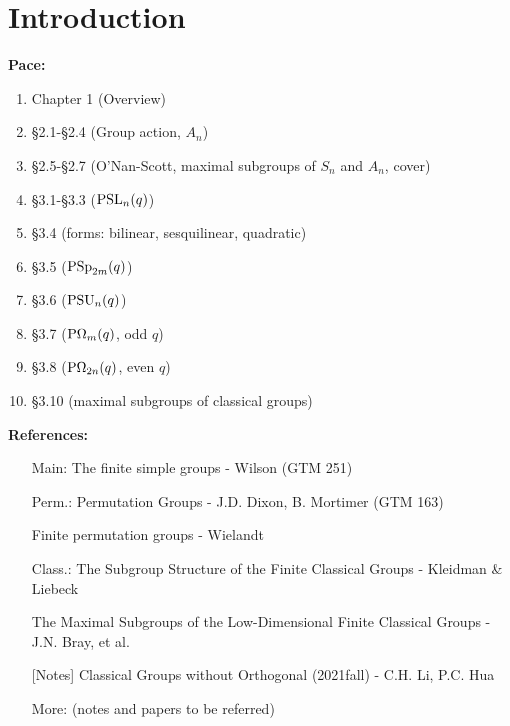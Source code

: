 \documentclass[a4paper,11pt]{article}
\begin{document}
\else %
\fi

\section{Introduction}
\textbf{Pace: }
\begin{enumerate}
	\item Chapter 1 (Overview)
	\item \S 2.1-\S 2.4 (Group action, $A_n$)
	\item \S 2.5-\S 2.7 (O'Nan-Scott, maximal subgroups of $S_n$ and $A_n$, cover)
	\item \S 3.1-\S 3.3 ($\mathrm{PSL}_n(q)$)
	\item \S 3.4 (forms: bilinear, sesquilinear, quadratic)
	\item \S 3.5 ($\mathrm{PSp}_{2m}(q)$)
	\item \S 3.6 ($\mathrm{PSU}_n(q)$)
	\item \S 3.7 ($\mathrm{P\Omega}_{m}(q)$, odd $q$)
	\item \S 3.8 ($\mathrm{P\Omega}_{2n}(q)$, even $q$)
	\item \S 3.10 (maximal subgroups of classical groups)
\end{enumerate}

\vline 

\noindent \textbf{References:}
\begin{itemize}
	\item[Main:] The finite simple groups - Wilson (GTM 251)
	\item[Perm.:] Permutation Groups - J.D. Dixon, B. Mortimer (GTM 163)
	\item[ ] Finite permutation groups - Wielandt
	\item[Class.:] The Subgroup Structure of the Finite Classical Groups - Kleidman \& Liebeck
	\item[ ] The Maximal Subgroups of the Low-Dimensional Finite Classical Groups - J.N. Bray, et al.
		\item[ ] [Notes] Classical Groups without Orthogonal (2021fall) - C.H. Li, P.C. Hua
	\item[More:] (notes and papers to be referred)
	\item[ ]
\end{itemize}


\newpage
\end{document}
